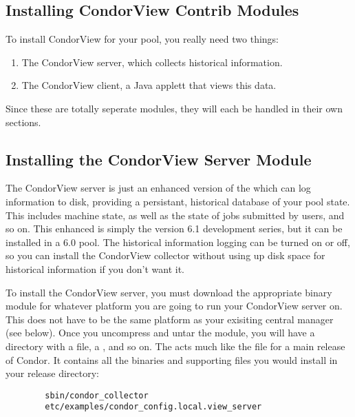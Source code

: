 \subsection{\label{sec:Contrib-CondorView-Install}
Installing CondorView Contrib Modules}

To install CondorView for your pool, you really need two things:
\begin{enumerate}
\item The CondorView server, which collects historical information.
\item The CondorView client, a Java applett that views this data.
\end{enumerate}

Since these are totally seperate modules, they will each be handled in
their own sections.

\subsection{\label{sec:CondorView-Server-Install}
Installing the CondorView Server Module}

The CondorView server is just an enhanced version of the
 which can log information to disk, providing a 
persistant, historical database of your pool state.
This includes machine state, as well as the state of jobs submitted by
users, and so on.
This enhanced  is simply the version 6.1 development
series, but it can be installed in a 6.0 pool.
The historical information logging can be turned on or off, so you can
install the CondorView collector without using up disk space for
historical information if you don't want it.

To install the CondorView server, you must download the appropriate
binary module for whatever platform you are going to run your
CondorView server on.
This does not have to be the same platform as your exisiting central
manager (see below).
Once you uncompress and untar the module, you will have a directory
with a  file, a , and so on.
The  acts much like the  file
for a main release of Condor.
It contains all the binaries and supporting files you would install in
your release directory:
\begin{verbatim}
        sbin/condor_collector
        etc/examples/condor_config.local.view_server
\end{verbatim}


